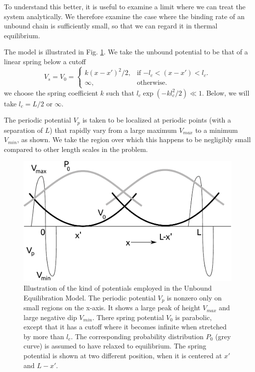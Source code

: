 \documentclass[11pt]{ucthesis}
\begin{document}
To understand this better, it is useful to examine a limit where we can treat
the system analytically. We therefore examine the case where the 
binding rate of an unbound chain is sufficiently small, so that we can regard it in thermal
equilibrium. 

The model is illustrated in Fig. \ref{fig:1dpot}. We take the unbound potential
to be that of a linear spring below a cutoff
\begin{equation}
\label{eq:v0cutoff}
V_s = V_0 =\begin{cases}
k (x - x')^2/2 , & \text{if $-l_c < (x-x')< l_c$}.\\
\infty, & \text{otherwise}.
\end{cases}
\end{equation}
we choose the spring coefficient $k$ such that
$l_c \exp(-k l_c^2/2) \ll 1$.  Below, we will take $l_c = L/2$ or $\infty$.

The periodic potential $V_p$ is taken to be localized at periodic points (with
a separation of $L$) that rapidly vary from a large maximum $V_{max}$ to a
minimum $V_{min}$, as shown. We take the region over which this happens to be
negligibly small compared to other length scales in the problem.\\
\vfill

\begin{figure}[htp]
\begin{center}
\includegraphics[width=\textwidth]{1dpot}
\caption{
Illustration of the kind of potentials employed in the Unbound Equilibration
Model. The periodic potential $V_p$ is nonzero only on small regions on the
x-axis. It shows a large peak of height $V_{max}$ and large negative dip
$V_{min}$. There spring potential $V_0$ is parabolic, except that it has a
cutoff where it becomes infinite when stretched by more than $l_c$. The
corresponding probability distribution $P_0$ (grey curve) is assumed to have relaxed to
equilibrium. The spring potential is shown at two different position, when it
is centered at $x'$ and $L-x'$.
}
\label{fig:1dpot}
\end{center}
\end{figure}
\end{document}
